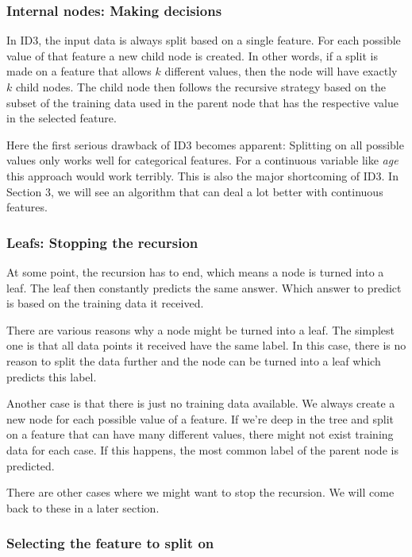 \documentclass[a4paper]{article}
\begin{document}
\subsubsection{Internal nodes: Making decisions}

In ID3, the input data is always split based on a single feature. For each possible value of that feature a new child node is created.
In other words, if a split is made on a feature that allows $k$ different values, then the node will have exactly $k$ child nodes.
The child node then follows the recursive strategy based on the subset of the training data used in the parent node that has the respective value in the selected feature.

Here the first serious drawback of ID3 becomes apparent: Splitting on all possible values only works well for categorical features. For a continuous variable like \emph{age} this approach would work terribly. This is also the major shortcoming of ID3. In Section 3, we will see an algorithm that can deal a lot better with continuous features.

\subsubsection{Leafs: Stopping the recursion}

At some point, the recursion has to end, which means a node is turned into a leaf. The leaf then constantly predicts the same answer. Which answer to predict is based on the training data it received.

There are various reasons why a node might be turned into a leaf. The simplest one is that all data points it received have the same label. In this case, there is no reason to split the data further and the node can be turned into a leaf which predicts this label.

Another case is that there is just no training data available. We always create a new node for each possible value of a feature. If we're deep in the tree and split on a feature that can have many different values, there might not exist training data for each case. If this happens, the most common label of the parent node is predicted.

There are other cases where we might want to stop the recursion. We will come back to these in a later section.

\subsubsection{Selecting the feature to split on}
\end{document}
